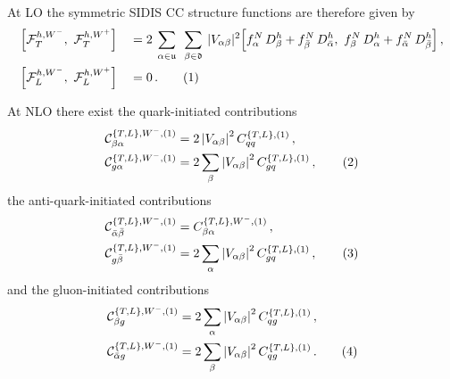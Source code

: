 \documentclass[11pt,a4paper]{article}
\newcommand{\Fcal}{\mathcal{F}}
\newcommand{\Ccal}{\mathcal{C}}
\newcommand{\CC}{\mathrm{CC}}
\newcommand\numberthis{\addtocounter{equation}{1}\tag{\theequation}}
\begin{document}
At LO the symmetric SIDIS $\CC$ structure functions are therefore given by
\begin{alignat*}{2}
& \Big[ \Fcal_{T}^{h,W^-},~ \Fcal_{T}^{h,W^+} \Big] &&= 2 \sum_{\phantom| \alpha\in \mathfrak{u} \phantom|} \sum_{\phantom| \beta  \in \mathfrak{d} \phantom| } |V_{\alpha\beta}|^2 \Big[ f_\alpha^N \, D_\beta^h + f_{\bar{\beta}}^N \, D_{\bar{\alpha}}^h ,~ f_\beta^N \, D_\alpha^h + f_{\bar{\alpha}}^N \, D_{\bar{\beta}}^h \Big] \, , \\
%
& \Big[ \Fcal_{L}^{h,W^-},~ \Fcal_{L}^{h,W^+} \Big] &&= 0 \, . \numberthis
\end{alignat*}

At NLO there exist the quark-initiated contributions
\begin{align*}
\Ccal^{\{T,L\},W^{-},(1)}_{\beta \alpha} &= 2\left|V_{\alpha\beta}\right|^2 C^{\{T,L\},(1)}_{qq} \,  , \\
\Ccal^{\{T,L\},W^{-},(1)}_{g\alpha} &= 2\sum_\beta \left|V_{\alpha\beta}\right|^2 C^{\{T,L\},(1)}_{gq} \,  , \numberthis
\end{align*}
the anti-quark-initiated contributions
\begin{align*}
\Ccal^{\{T,L\},W^{-},(1)}_{\bar{\alpha}\bar{\beta}} &= C^{\{T,L\},W^{-},(1)}_{\beta\alpha}  \,  , \\
\Ccal^{\{T,L\},W^{-},(1)}_{g\bar{\beta}} & = 2 \sum_\alpha \left|V_{\alpha\beta}\right|^2 C^{\{T,L\},(1)}_{gq} \, ,\numberthis
\end{align*}
and the gluon-initiated contributions
\begin{align*}
\Ccal^{\{T,L\},W^{-},(1)}_{\beta g} &=  2\sum_\alpha \left|V_{\alpha\beta}\right|^2 C^{\{T,L\},(1)}_{qg} \,  , \\
%
\Ccal^{\{T,L\},W^{-},(1)}_{\bar{\alpha}g}  & =  2\sum_\beta \left|V_{\alpha\beta}\right|^2 C^{\{T,L\},(1)}_{qg} \, . \numberthis
\end{align*}
\end{document}
